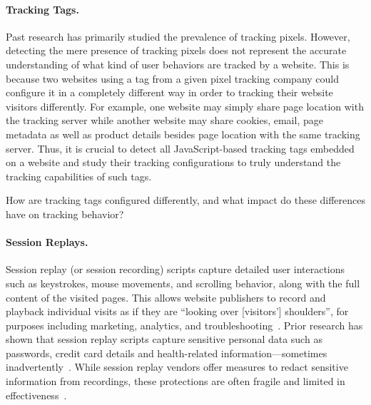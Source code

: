 \paragraph{Tracking Tags.}
Past research \cite{Narayanan2017WebtapSpringer,englehardtOnlineTracking1millionsite2016,lernerInternetJonesRaiders2016, bekosHitchhikersGuideFacebook2023} has primarily studied the prevalence of tracking pixels.
%
However, detecting the mere presence of tracking pixels does not represent the accurate understanding of what kind of user behaviors are tracked by a website.
%
This is because two websites using a tag from a given pixel tracking company could configure it in a completely different way in order to tracking their website visitors differently.
%
For example, one website may simply share page location with the tracking server while another website may share cookies, email, page metadata as well as product details besides page location with the same tracking server.
%
Thus, it is crucial to detect all JavaScript-based tracking tags embedded on a website and study their tracking configurations to truly understand the tracking capabilities of such tags.
\begin{opbox}
How are tracking tags configured differently, and what impact do these differences have on tracking behavior?
\end{opbox}


\paragraph{Session Replays.}
Session replay (or session recording) scripts capture detailed user interactions such as keystrokes, mouse movements, and scrolling behavior, along with the full content of the visited pages.
%
This allows website publishers to record and playback individual visits as if they are ``looking over [visitors’] shoulders'', for purposes including marketing, analytics, and troubleshooting~\cite{AdvancedUsageInspectlet}.
%
Prior research has shown that session replay scripts capture sensitive personal data such as passwords, credit card details and health-related information---sometimes inadvertently~\cite{acarNoBoundariesData2020,senolLeakyFormsStudy2022,yuGotSickTracked2022}.
%
While session replay vendors offer measures to redact sensitive information from recordings, these protections are often fragile and limited in effectiveness~\cite{englehardtNoBoundariesCredentials2018,acarNoBoundariesData2020}.

